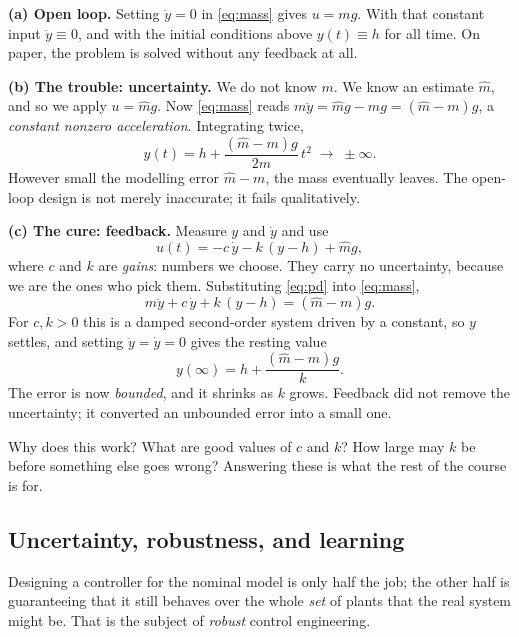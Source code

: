\documentclass[11pt]{article}
\begin{document}
\smallskip
\noindent\textbf{(a) Open loop.} Setting $\ddot y=0$ in \eqref{eq:mass} gives
$u=mg$. With that constant input $\ddot y \equiv 0$, and with the initial
conditions above $y(t)\equiv h$ for all time. On paper, the problem is solved
without any feedback at all.

\smallskip
\noindent\textbf{(b) The trouble: uncertainty.} We do not know $m$. We know an
estimate $\hat m$, and so we apply $u=\hat m g$. Now \eqref{eq:mass} reads
$m\ddot y = \hat m g - mg = (\hat m - m)g$, a \emph{constant nonzero
acceleration}. Integrating twice,
\[
   y(t) = h + \frac{(\hat m-m)g}{2m}\,t^{2}\;\longrightarrow\;\pm\infty .
\]
However small the modelling error $\hat m - m$, the mass eventually leaves. The
open-loop design is not merely inaccurate; it fails qualitatively.

\smallskip
\noindent\textbf{(c) The cure: feedback.} Measure $y$ and $\dot y$ and use
\begin{equation}\label{eq:pd}
   u(t) = -c\,\dot y - k\,(y-h) + \hat m g ,
\end{equation}
where $c$ and $k$ are \emph{gains}: numbers we choose. They carry no uncertainty,
because we are the ones who pick them. Substituting \eqref{eq:pd} into
\eqref{eq:mass},
\begin{equation}\label{eq:massfb}
   m\ddot y + c\,\dot y + k\,(y-h) = (\hat m-m)g .
\end{equation}
For $c,k>0$ this is a damped second-order system driven by a constant, so $y$
settles, and setting $\ddot y=\dot y=0$ gives the resting value
\begin{equation}\label{eq:offset}
   y(\infty) = h + \frac{(\hat m - m)g}{k}.
\end{equation}
The error is now \emph{bounded}, and it shrinks as $k$ grows. Feedback did not
remove the uncertainty; it converted an unbounded error into a small one.

\begin{question}
Why does this work? What are good values of $c$ and $k$? How large may $k$ be
before something else goes wrong? Answering these is what the rest of the course
is for.
\end{question}

\subsection{Uncertainty, robustness, and learning}
Designing a controller for the nominal model is only half the job; the other half
is guaranteeing that it still behaves over the whole \emph{set} of plants that the
real system might be. That is the subject of \emph{robust} control engineering.
\end{document}
